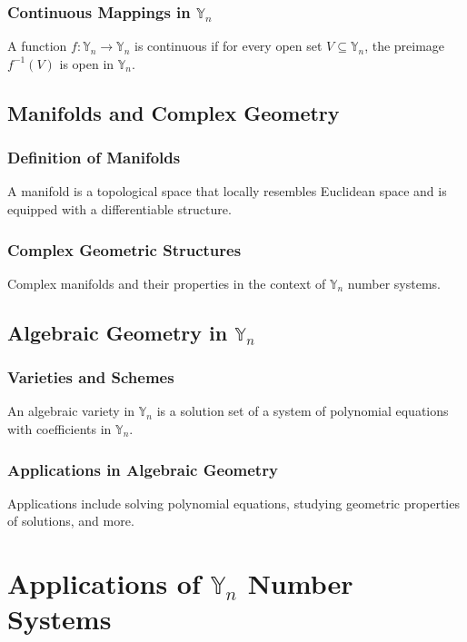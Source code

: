 \documentclass[12pt]{book}
\begin{document}
\subsection{Continuous Mappings in $\mathbb{Y}_n$}
\begin{definition}
A function $f: \mathbb{Y}_n \to \mathbb{Y}_n$ is continuous if for every open set $V \subseteq \mathbb{Y}_n$, the preimage $f^{-1}(V)$ is open in $\mathbb{Y}_n$.
\end{definition}

\section{Manifolds and Complex Geometry}
\subsection{Definition of Manifolds}
\begin{definition}
A manifold is a topological space that locally resembles Euclidean space and is equipped with a differentiable structure.
\end{definition}
\subsection{Complex Geometric Structures}
Complex manifolds and their properties in the context of $\mathbb{Y}_n$ number systems.

\section{Algebraic Geometry in $\mathbb{Y}_n$}
\subsection{Varieties and Schemes}
\begin{definition}
An algebraic variety in $\mathbb{Y}_n$ is a solution set of a system of polynomial equations with coefficients in $\mathbb{Y}_n$.
\end{definition}
\subsection{Applications in Algebraic Geometry}
Applications include solving polynomial equations, studying geometric properties of solutions, and more.

\chapter{Applications of $\mathbb{Y}_n$ Number Systems}
\end{document}

